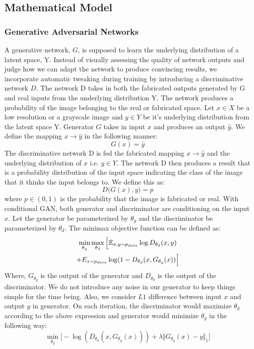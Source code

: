 \documentclass[10pt,twocolumn,letterpaper]{article}
\begin{document}
    \subsection{Mathematical Model}
    \subsubsection{Generative Adversarial Networks}
     A generative network, $G$, is supposed to learn the underlying distribution of a latent space, Y. Instead of visually assessing the quality of network outputs and judge how we can adapt the network to produce convincing results, we incorporate automatic tweaking during training by introducing a discriminative network $D$. The network D takes in both the fabricated outputs generated by G and real inputs from the underlying distribution Y. The network produces a probability of the image belonging to the real or fabricated space.
     Let $x \in X$ be a low resolution or a grayscale image and $y \in Y$ be it's underlying distribution from the latent space Y. Generator $G$ takes in input $x$ and produces an output $\hat{y}$. We define the mapping $x \rightarrow \hat{y}$ in the following manner:
      \begin{equation}
          G(x) = \hat{y}
      \end{equation}
     The discriminative network D is fed the fabricated mapping $x \rightarrow \hat{y}$ and the underlying distribution of $x$ i.e. $y \in Y$. The network D then produces a result that is a probability distribution of the input space indicating the class of the image that it thinks the input belongs to. We define this as:
     \begin{equation}
         D\big(G(x),y\big) = p
     \end{equation}
     where $p \in (0,1)$ is the probability that the image is fabricated or real.
    With conditional GAN, both generator and discriminator are conditioning on the input $x$. Let the generator be parameterized by $\theta_g$ and the discriminator be parameterized by $\theta_d$. The minimax objective function can be defined as:
    \begin{multline}
    		\min_{\theta_g}\max_{\theta_d}\Big[\mathbb{E}_{x,y\sim p_{data}} \log D_{\theta_d}(x,y) \\+ E_{{x\sim p_{data}}} \log(1 - D_{\theta_d}(x, G_{\theta_g}(x))\Big]
        \normalsize
    \end{multline}
    Where, $G_{\theta_{g}}$ is the output of the generator and $D_{\theta_d}$ is the output of the discriminator. We do not introduce any noise in our generator to keep things simple for the time being. Also, we consider $L1$ difference between input $x$ and output $y$ in generator. On each iteration, the discriminator would maximize $\theta_d$ according to the above expression and generator would minimize $\theta_g$ in the following way:
        \begin{equation}
            \min_{\theta_g}\Big[-\log(D_{\theta_d}(x,G_{\theta_g}(x)))+\lambda \Vert G_{\theta_g}(x) - y \Vert_1 \Big]
    	 \end{equation}
\end{document}
